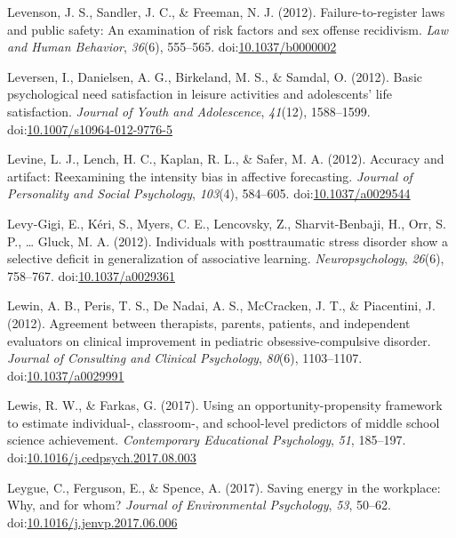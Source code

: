 \documentclass[english,man]{apa6}
\theoremstyle{definition}
\theoremstyle{definition}
\theoremstyle{definition}
\theoremstyle{remark}
\begin{document}
\hypertarget{ref-Levenson2012a}{}
Levenson, J. S., Sandler, J. C., \& Freeman, N. J. (2012).
Failure-to-register laws and public safety: An examination of risk
factors and sex offense recidivism. \emph{Law and Human Behavior},
\emph{36}(6), 555--565.
doi:\href{https://doi.org/10.1037/b0000002}{10.1037/b0000002}

\hypertarget{ref-Leversen2012}{}
Leversen, I., Danielsen, A. G., Birkeland, M. S., \& Samdal, O. (2012).
Basic psychological need satisfaction in leisure activities and
adolescents' life satisfaction. \emph{Journal of Youth and Adolescence},
\emph{41}(12), 1588--1599.
doi:\href{https://doi.org/10.1007/s10964-012-9776-5}{10.1007/s10964-012-9776-5}

\hypertarget{ref-Levine2012}{}
Levine, L. J., Lench, H. C., Kaplan, R. L., \& Safer, M. A. (2012).
Accuracy and artifact: Reexamining the intensity bias in affective
forecasting. \emph{Journal of Personality and Social Psychology},
\emph{103}(4), 584--605.
doi:\href{https://doi.org/10.1037/a0029544}{10.1037/a0029544}

\hypertarget{ref-Levy-Gigi2012}{}
Levy-Gigi, E., Kéri, S., Myers, C. E., Lencovsky, Z., Sharvit-Benbaji,
H., Orr, S. P., \ldots{} Gluck, M. A. (2012). Individuals with
posttraumatic stress disorder show a selective deficit in generalization
of associative learning. \emph{Neuropsychology}, \emph{26}(6), 758--767.
doi:\href{https://doi.org/10.1037/a0029361}{10.1037/a0029361}

\hypertarget{ref-Lewin2012}{}
Lewin, A. B., Peris, T. S., De Nadai, A. S., McCracken, J. T., \&
Piacentini, J. (2012). Agreement between therapists, parents, patients,
and independent evaluators on clinical improvement in pediatric
obsessive-compulsive disorder. \emph{Journal of Consulting and Clinical
Psychology}, \emph{80}(6), 1103--1107.
doi:\href{https://doi.org/10.1037/a0029991}{10.1037/a0029991}

\hypertarget{ref-Lewis2017}{}
Lewis, R. W., \& Farkas, G. (2017). Using an opportunity-propensity
framework to estimate individual-, classroom-, and school-level
predictors of middle school science achievement. \emph{Contemporary
Educational Psychology}, \emph{51}, 185--197.
doi:\href{https://doi.org/10.1016/j.cedpsych.2017.08.003}{10.1016/j.cedpsych.2017.08.003}

\hypertarget{ref-Leygue2017}{}
Leygue, C., Ferguson, E., \& Spence, A. (2017). Saving energy in the
workplace: Why, and for whom? \emph{Journal of Environmental
Psychology}, \emph{53}, 50--62.
doi:\href{https://doi.org/10.1016/j.jenvp.2017.06.006}{10.1016/j.jenvp.2017.06.006}
\end{document}
